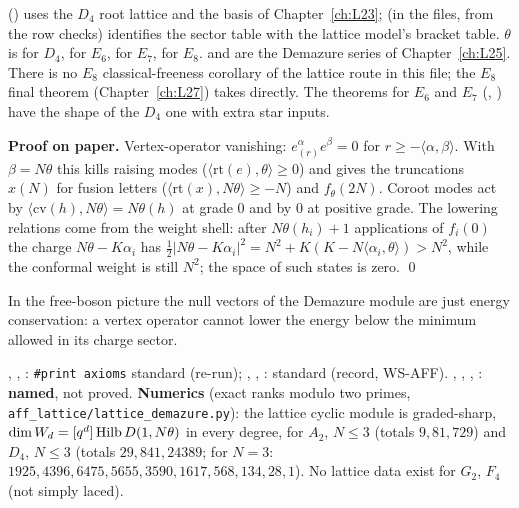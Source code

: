 \begin{dictionary}
 () uses the $D_4$ root lattice  and the basis  of
Chapter~\ref{ch:L23};  (in the  files, from the row checks) identifies the sector table with the lattice
model's bracket table. $\theta$ is  for $D_4$,  for $E_6$,  for $E_7$,  for $E_8$.
 and  are the Demazure series of Chapter~\ref{ch:L25}. There is no $E_8$
classical-freeness corollary of the lattice route in this file; the $E_8$ final theorem (Chapter~\ref{ch:L27}) takes
 directly. The  theorems for $E_6$ and $E_7$ (, )
have the shape of the $D_4$ one with extra star inputs.
\end{dictionary}

\textbf{Proof on paper.} Vertex-operator vanishing: $e^\alpha_{(r)}e^\beta=0$ for $r\ge-\langle\alpha,\beta\rangle$. With $\beta=N\theta$ this
kills raising modes ($\langle\mathrm{rt}(e),\theta\rangle\ge0$) and gives the truncations $x(N)$ for fusion letters
($\langle\mathrm{rt}(x),N\theta\rangle\ge-N$) and $f_\theta(2N)$. Coroot modes act by $\langle\mathrm{cv}(h),N\theta\rangle=N\theta(h)$ at grade $0$ and
by $0$ at positive grade. The lowering relations come from the weight shell: after $N\theta(h_i)+1$ applications of $f_i(0)$ the
charge $N\theta-K\alpha_i$ has $\tfrac12|N\theta-K\alpha_i|^2=N^2+K(K-N\langle\alpha_i,\theta\rangle)>N^2$, while the conformal weight is
still $N^2$; the space of such states is zero. \qed

\begin{physics}
In the free-boson picture the null vectors of the Demazure module are just energy conservation: a vertex operator cannot lower
the energy below the minimum allowed in its charge sector.
\end{physics}

\begin{status}
, , : \texttt{\#print axioms} standard (re-run);
, , : standard (record, WS-AFF). , ,
, : \textbf{named}, not proved. \textbf{Numerics} (exact ranks modulo two primes,
\texttt{aff\_lattice/lattice\_demazure.py}): the lattice cyclic module is graded-sharp, $\dim W_d=[q^d]\operatorname{Hilb} D(1,N\theta)$ in every
degree, for $A_2$, $N\le3$ (totals $9,81,729$) and $D_4$, $N\le3$ (totals $29,841,24389$; for $N=3$:
$1925,4396,6475,5655,3590,1617,568,134,28,1$). No lattice data exist for $G_2$, $F_4$ (not simply laced).
\end{status}

